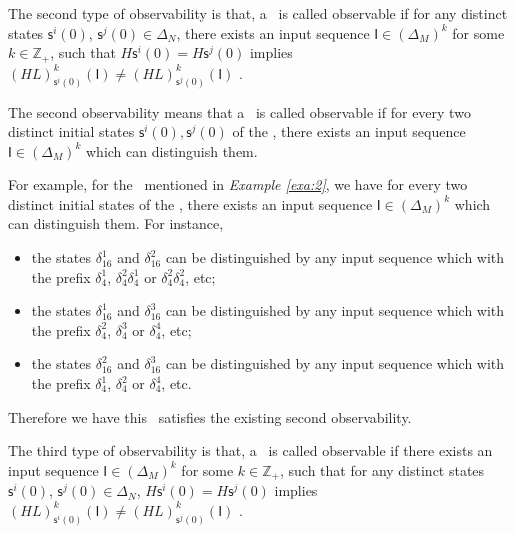 \begin{definition}
	The second type of observability is that, a \BCN\ is called observable if for any distinct states $\mathsf{s}^{i}(0)$, $\mathsf{s}^{j}(0) \in \Delta_N$, there exists an input sequence $\mathsf{I}\in(\Delta_M)^k$ for some $k\in \mathbb{Z}_+$, such that $H\mathsf{s}^{i}(0)=H\mathsf{s}^{j}(0)$ implies $(HL)^k_{\mathsf{s}^{i}(0)}(\mathsf{I})\neq (HL)^k_{\mathsf{s}^{j}(0)}(\mathsf{I})$ \cite{Zhao2010Input}.
\end{definition}

The second observability means that a \BCN\ is called observable if for every two distinct initial states $\mathsf{s}^{i}(0), \mathsf{s}^{j}(0)$ of the \BCN, there exists an input sequence $\mathsf{I}\in(\Delta_M)^k$ which can distinguish them. 
\begin{example}
For example, for the \BCN\ mentioned in {\em Example \ref{exa:2}}, we have for every two distinct initial states of the \BCN, there exists an input sequence $\mathsf{I}\in(\Delta_M)^k$ which can distinguish them.  For instance,
\begin{itemize}
  \item the states $\delta_{16}^1$ and $\delta_{16}^2$ can be distinguished by any input sequence which with the prefix $\delta_{4}^1$, $\delta_{4}^2 \delta_{4}^1$ or $\delta_{4}^2 \delta_{4}^2$, etc;
  \item the states $\delta_{16}^1$ and $\delta_{16}^3$  can be distinguished by any input sequence which with the prefix $\delta_{4}^2$, $\delta_{4}^3$ or $\delta_{4}^4$, etc;
  \item the states $\delta_{16}^2$ and $\delta_{16}^3$  can be distinguished by any input sequence which with the prefix $\delta_{4}^1$, $\delta_{4}^2$ or $\delta_{4}^4$, etc.
\end{itemize} 

Therefore we have this \BCN\ satisfies the existing second observability.
\label{exa:5}
\end{example}   
\begin{definition}
The third type of observability is that, a \BCN\ is called observable if there exists an input sequence $\mathsf{I}\in(\Delta_M)^k$ for some $k\in \mathbb{Z}_+$, such that for any distinct states $\mathsf{s}^{i}(0)$, $\mathsf{s}^{j}(0) \in \Delta_N$, $H\mathsf{s}^{i}(0)=H\mathsf{s}^{j}(0)$ implies $(HL)^k_{\mathsf{s}^{i}(0)}(\mathsf{I})\neq (HL)^k_{\mathsf{s}^{j}(0)}(\mathsf{I})$ \cite{Cheng2011Identification}.
\end{definition}

